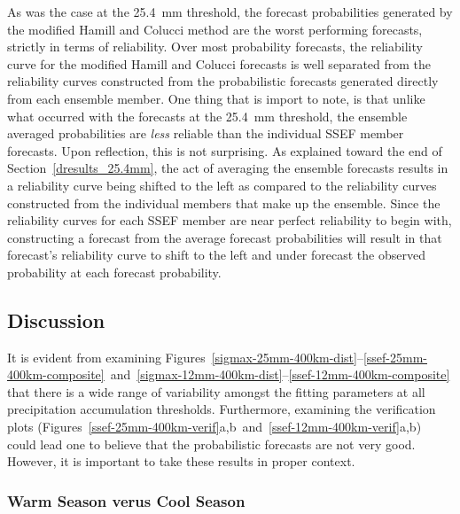 As was the case at the \mbox{25.4 mm} threshold, the forecast probabilities generated by the modified Hamill and Colucci method are the worst performing forecasts, strictly in terms of reliability.
Over most probability forecasts, the reliability curve for the modified Hamill and Colucci forecasts is well separated from the reliability curves constructed from the probabilistic forecasts generated directly from each ensemble member.
One thing that is import to note, is that unlike what occurred with the forecasts at the \mbox{25.4 mm} threshold, the ensemble averaged probabilities are \emph{less} reliable than the individual SSEF member forecasts.
Upon reflection, this is not surprising. As explained toward the end of \mbox{Section \ref{dresults_25.4mm}}, the act of averaging the ensemble forecasts results in a reliability curve being shifted to the left as compared to the reliability curves constructed from the individual members that make up the ensemble.
Since the reliability curves for each SSEF member are near perfect reliability to begin with, constructing a forecast from the average forecast probabilities will result in that forecast's reliability curve to shift to the left and under forecast the observed probability at each forecast probability.




\subsection{Discussion}
\label{ediscussion}

It is evident from examining \mbox{Figures \ref{sigmax-25mm-400km-dist}--\ref{ssef-25mm-400km-composite} and \ref{sigmax-12mm-400km-dist}--\ref{ssef-12mm-400km-composite}} that there is a wide range of variability amongst the fitting parameters at all precipitation accumulation thresholds.
Furthermore, examining the verification plots (\mbox{Figures \ref{ssef-25mm-400km-verif}a,b and \ref{ssef-12mm-400km-verif}a,b}) could lead one to believe that the probabilistic forecasts are not very good.
However, it is important to take these results in proper context.




\subsubsection{Warm Season verus Cool Season}

